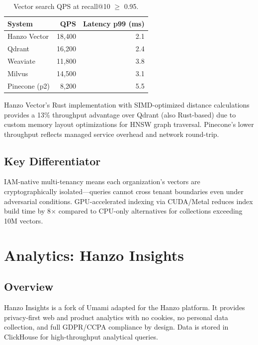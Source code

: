 \documentclass[11pt,twocolumn]{article}
\begin{document}
\begin{table}[H]
\centering
\caption{Vector search QPS at recall@10 $\geq$ 0.95.}
\footnotesize
\begin{tabular}{@{}lrr@{}}
\toprule
System & QPS & Latency p99 (ms) \\
\midrule
Hanzo Vector & 18,400 & 2.1 \\
Qdrant & 16,200 & 2.4 \\
Weaviate & 11,800 & 3.8 \\
Milvus & 14,500 & 3.1 \\
Pinecone (p2) & 8,200 & 5.5 \\
\bottomrule
\end{tabular}
\end{table}

Hanzo Vector's Rust implementation with SIMD-optimized distance calculations provides a 13\% throughput advantage over Qdrant (also Rust-based) due to custom memory layout optimizations for HNSW graph traversal. Pinecone's lower throughput reflects managed service overhead and network round-trip.

\subsection{Key Differentiator}

IAM-native multi-tenancy means each organization's vectors are cryptographically isolated---queries cannot cross tenant boundaries even under adversarial conditions. GPU-accelerated indexing via CUDA/Metal reduces index build time by 8$\times$ compared to CPU-only alternatives for collections exceeding 10M vectors.

\section{Analytics: Hanzo Insights}
\label{sec:analytics}

\subsection{Overview}

Hanzo Insights is a fork of Umami adapted for the Hanzo platform. It provides privacy-first web and product analytics with no cookies, no personal data collection, and full GDPR/CCPA compliance by design. Data is stored in ClickHouse for high-throughput analytical queries.
\end{document}
